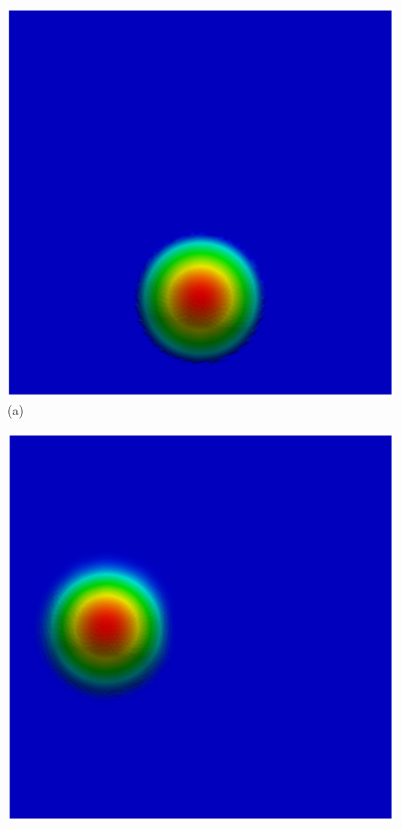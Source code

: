 \vspace{0.5cm}
\begin{figure}[H]
     \centering
     \begin{minipage}{.5\linewidth}
      \centering
      \includegraphics[scale=0.42]{./02_chaps/cap_validation/figure/figSLquad0.png}\\
      (a)
     \end{minipage}%
     \begin{minipage}{.5\linewidth}
      \centering
      \includegraphics[scale=0.42]{./02_chaps/cap_validation/figure/figSLquad1.png}\\

\end{minipage}
\end{figure}
